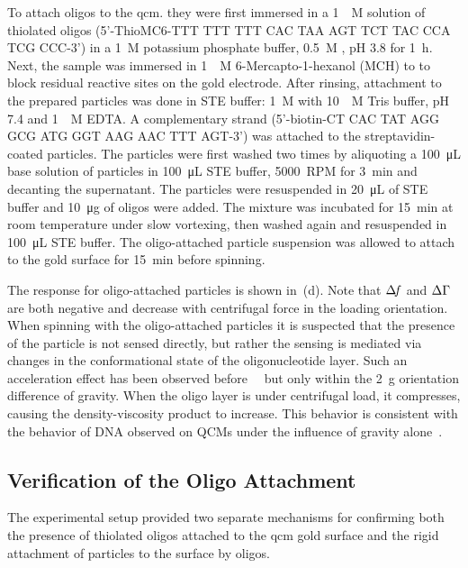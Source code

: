 To attach oligos to the \gls{qcm}. they were first immersed in a
\SI{1}{\micro\textsc{M}} solution of thiolated oligos (5'-ThioMC6-TTT TTT
TTT CAC TAA AGT TCT TAC CCA TCG CCC-3') in a \SI{1}{\textsc{M}} potassium
phosphate buffer, \SI{0.5}{\textsc{M}} , pH 3.8 for
\SI{1}{\hour}.  Next, the sample was immersed in \SI{1}{\milli\textsc{M}}
6-Mercapto-1-hexanol (MCH) to to block residual reactive sites on the
gold electrode.  After rinsing, attachment to the prepared particles was
done in STE buffer: \SI{1}{\textsc{M}}  with
\SI{10}{\milli\textsc{M}} Tris buffer, pH 7.4 and \SI{1}{\milli\textsc{M}}
EDTA\@.  A complementary strand (5'-biotin-CT CAC TAT AGG GCG ATG GGT AAG
AAC TTT AGT-3') was attached to the streptavidin-coated particles.  The
particles were first washed two times by aliquoting a
\SI{100}{\micro\liter} base solution of particles in \SI{100}{\micro\liter}
STE buffer, \SI{5000}{RPM} for \SI{3}{\minute} and decanting the
supernatant.  The particles were resuspended in \SI{20}{\micro\liter} of
STE buffer and \SI{10}{\micro\gram} of oligos were added.  The mixture was
incubated for \SI{15}{\minute} at room temperature under slow vortexing,
then washed again and resuspended in \SI{100}{\micro\liter} STE buffer.
The oligo-attached particle suspension was allowed to attach to the gold
surface for \SI{15}{\minute} before spinning.

The response for oligo-attached particles is shown in
\,(d).  Note that $\Delta\!f$ and $\Delta\Gamma$ are both negative and
decrease with centrifugal force in the loading orientation.  When spinning
with the oligo-attached particles it is suspected that the presence of the
particle is not sensed directly, but rather the sensing is mediated via
changes in the conformational state of the oligonucleotide layer.  Such an
acceleration effect has been observed
before~\cite{yoshimoto2002effect}~\cite{fawcett2004evidence} but only within
the \SI{2}{g} orientation difference of gravity.  When the oligo layer is
under centrifugal load, it compresses, causing the density-viscosity product
to increase.  This behavior is consistent with the behavior of DNA observed on
QCMs under the influence of gravity alone~\cite{fawcett2004evidence}.

\subsection{Verification of the Oligo Attachment}
The experimental setup provided two separate mechanisms for confirming both
the presence of thiolated oligos attached to the \gls{qcm} gold surface and the
rigid attachment of particles to the surface by oligos.

